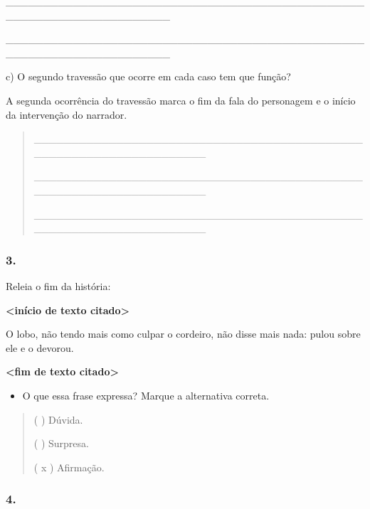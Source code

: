 \_\_\_\_\_\_\_\_\_\_\_\_\_\_\_\_\_\_\_\_\_\_\_\_\_\_\_\_\_\_\_\_\_\_\_\_\_\_\_\_\_\_\_\_\_\_\_\_\_\_\_\_\_\_\_\_\_\_\_\_\_\_\_\_\_\_\_\_\_\_

\_\_\_\_\_\_\_\_\_\_\_\_\_\_\_\_\_\_\_\_\_\_\_\_\_\_\_\_\_\_\_\_\_\_\_\_\_\_\_\_\_\_\_\_\_\_\_\_\_\_\_\_\_\_\_\_\_\_\_\_\_\_\_\_\_\_\_\_\_\_

c) O segundo travessão que ocorre em cada caso tem que função?

A segunda ocorrência do travessão marca o fim da fala do personagem e o
início da intervenção do narrador.

\begin{quote}
\_\_\_\_\_\_\_\_\_\_\_\_\_\_\_\_\_\_\_\_\_\_\_\_\_\_\_\_\_\_\_\_\_\_\_\_\_\_\_\_\_\_\_\_\_\_\_\_\_\_\_\_\_\_\_\_\_\_\_\_\_\_\_\_\_\_\_

\_\_\_\_\_\_\_\_\_\_\_\_\_\_\_\_\_\_\_\_\_\_\_\_\_\_\_\_\_\_\_\_\_\_\_\_\_\_\_\_\_\_\_\_\_\_\_\_\_\_\_\_\_\_\_\_\_\_\_\_\_\_\_\_\_\_\_

\_\_\_\_\_\_\_\_\_\_\_\_\_\_\_\_\_\_\_\_\_\_\_\_\_\_\_\_\_\_\_\_\_\_\_\_\_\_\_\_\_\_\_\_\_\_\_\_\_\_\_\_\_\_\_\_\_\_\_\_\_\_\_\_\_\_\_
\end{quote}

\subsubsection{3. }\label{section-34}

Releia o fim da história:

\textbf{\textless{}início de texto citado\textgreater{}}

O lobo, não tendo mais como culpar o cordeiro, não disse mais nada:
pulou sobre ele e o devorou.

\textbf{\textless{}fim de texto citado\textgreater{}}

\begin{itemize}
\item
  O que essa frase expressa? Marque a alternativa correta.
\end{itemize}

\begin{quote}
( ) Dúvida.

( ) Surpresa.

( x ) Afirmação.
\end{quote}

\subsubsection{4. }\label{section-35}

